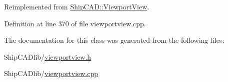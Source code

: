 Reimplemented from \hyperlink{classShipCAD_1_1ViewportView_a2dc46f8d032d707308cf853c70bc965a}{Ship\-C\-A\-D\-::\-Viewport\-View}.



Definition at line 370 of file viewportview.\-cpp.



The documentation for this class was generated from the following files\-:\begin{DoxyCompactItemize}
\item 
Ship\-C\-A\-Dlib/\hyperlink{viewportview_8h}{viewportview.\-h}\item 
Ship\-C\-A\-Dlib/\hyperlink{viewportview_8cpp}{viewportview.\-cpp}\end{DoxyCompactItemize}
